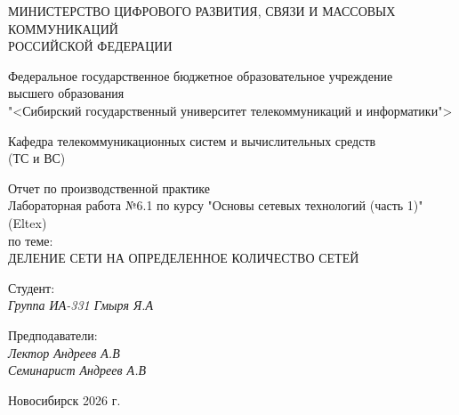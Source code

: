 \thispagestyle{empty}

\begin{center}
    МИНИСТЕРСТВО ЦИФРОВОГО РАЗВИТИЯ, СВЯЗИ И МАССОВЫХ КОММУНИКАЦИЙ \\ РОССИЙСКОЙ ФЕДЕРАЦИИ

    \vspace{20pt}

    Федеральное государственное бюджетное образовательное учреждение  \\  высшего образования \\
    "<Сибирский государственный университет телекоммуникаций и информатики"> \\

    \vspace{20pt}

    Кафедра телекоммуникационных систем и вычислительных средств \\  (ТС и ВС)
\end{center}

\vfill

\begin{center}
    Отчет по производственной практике \\  
    Лабораторная работа №6.1 по курсу "Основы сетевых технологий (часть 1)" (Eltex) \\
    \vspace{20pt}
    по теме: \\
    \uppercase{Деление сети на определенное количество сетей}
\end{center}

\vfill

    \noindent Студент: \\
    \textit{Группа ИА-331 \hfill Гмыря Я.А} 

    \vspace{20pt}
 
    \noindent Предподаватели: \\
    \textit{Лектор \hfill Андреев А.В} \\
    \textit{Семинарист \hfill Андреев А.В}

\vfill

\begin{center}
    Новосибирск 2026 г.
\end{center}
